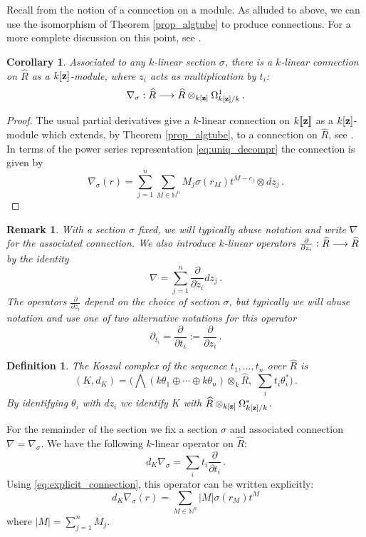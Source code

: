 \documentclass[english,letter paper,12pt,leqno]{article}
\newtheorem{corollary}[theorem]{Corollary}
\theoremstyle{example}
\newtheorem{definition}[theorem]{Definition}
\newtheorem{remark}[theorem]{Remark}
\numberwithin{equation}{section}
\def\be{\begin{equation}}
\def\ee{\end{equation}}
\begin{document}
Recall from \cite[\S 8.1.1]{loday} the notion of a connection on a module. As alluded to above, we can use the isomorphism of Theorem \ref{prop_algtube} to produce connections. For a more complete discussion on this point, see \cite[Appendix B]{dm1102.2957}.

\begin{corollary} Associated to any $k$-linear section $\sigma$, there is a $k$-linear connection on $\widehat{R}$ as a $k[\bold{z}]$-module, where $z_i$ acts as multiplication by $t_i$:
\be
\nabla_\sigma: \widehat{R} \lto \widehat{R} \otimes_{k[\bold{z}]} \Omega^1_{k[\bold{z}]/k}\,.
\ee
\end{corollary}
\begin{proof}
The usual partial derivatives give a $k$-linear connection on $k\llbracket \bold{z} \rrbracket$ as a $k[\bold{z}]$-module which extends, by Theorem \ref{prop_algtube}, to a connection on $\widehat{R}$, see \cite[\S 8.1.3]{loday}. In terms of the power series representation \eqref{eq:uniq_decompr} the connection is given by
\be\label{eq:explicit_connection}
\nabla_\sigma(r) = \sum_{j=1}^n \sum_{M \in \mathbb{N}^n} M_j \sigma(r_M) t^{M - e_j} \otimes dz_j\,.
\ee
\end{proof}

\begin{remark} With a section $\sigma$ fixed, we will typically abuse notation and write $\nabla$ for the associated connection. We also introduce $k$-linear operators $\frac{\partial}{\partial z_i}: \widehat{R} \longrightarrow \widehat{R}$ by the identity
\[
\nabla = \sum_{j=1}^n \frac{\partial}{\partial z_i} dz_j \,.
\]
The operators $\frac{\partial}{\partial z_i}$ depend on the choice of section $\sigma$, but typically we will abuse notation and use one of two alternative notations for this operator
\[
\partial_{t_i} = \frac{\partial}{\partial t_i} := \frac{\partial}{\partial z_i}\,.
\]
\end{remark}

\begin{definition} The Koszul complex of the sequence $t_1,\ldots,t_n$ over $\widehat{R}$ is
\[
(K, d_K) = \Big( \bigwedge( k \theta_1 \oplus \cdots \oplus k \theta_n ) \otimes_k \widehat{R}, \,\,\sum_i t_i \theta_i^* \Big)\,.
\]
By identifying $\theta_i$ with $dz_i$ we identify $K$ with $\widehat{R} \otimes_{k[\bold{z}]} \Omega^*_{k[\bold{z}]/k}$.
\end{definition}

For the remainder of the section we fix a section $\sigma$ and associated connection $\nabla = \nabla_\sigma$. We have the following $k$-linear operator on $\widehat{R}$:
\be\label{eq:explicitdknabla}
d_K \nabla_\sigma = \sum_i t_i \frac{\partial}{\partial t_i}\,.
\ee
Using \eqref{eq:explicit_connection}, this operator can be written explicitly:
\[
d_K \nabla_\sigma(r) = \sum_{M \in \mathbb{N}^n} |M| \sigma(r_M) t^M
\]
where $|M| = \sum_{j=1}^n M_j$.
\end{document}
